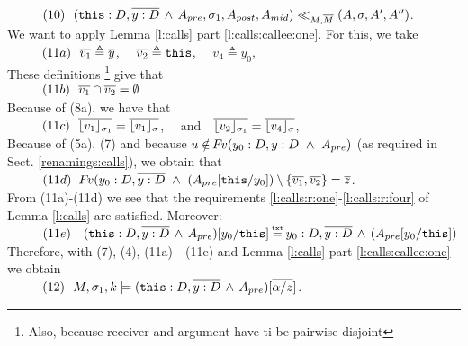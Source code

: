 \begin{description}
$\SPS (10) \ \ (\prg{this}:D,\overline{y:D}\, \wedge\, A_{pre},\sigma_1,A_{post}, A_{mid}) \ll_{M,\Mtwo} (A,\sigma,A', A'')$. 
\\
We want to apply Lemma   \ref{l:calls} part \ref{l:calls:callee:one}. For this, we take
\\
$\SPS (11a) \ \  \overline {v_1} \triangleq \overline y$, \ \ $\overline {v_2} \triangleq  \prg{this}$, \ \ $\overline {v_4} \triangleq  y_0$, 
\\
These definitions  \footnote{Also, because receiver and argument have ti be pairwise disjoint} give that 
\\
$\SPS (11b) \ \  \overline {v_1}\cap   \overline{v_2} = \emptyset $
\\
Because of (8a), we have that \\
$\SPS (11c) \ \ \overline {\interpret {\sigma_1} {v_1} } = \overline {\interpret {\sigma} {v_1} }$, \ \ and\ \  $\overline {\interpret {\sigma_1}  {v_2} } = \overline {\interpret {\sigma} {v_4} }$,\\
Because of (5a), (7)  and because $u\notin \fv(y_0:D ,\overline {y:D}\ \wedge \  A_{pre})$ (as required in Sect. \ref{renamings:calls}), we obtain that \\
$\SPS (11d) \ \ \fv(y_0:D ,\overline {y:D}\ \wedge \  (A_{pre}[\prg{this}/y_0]) \setminus \{ \overline {v_1}, \overline {v_2} \} =  \overline z$.    
\\
From   (11a)-(11d) we see that the requirements  \ref{l:calls:r:one}-\ref{l:calls:r:four} of Lemma \ref{l:calls}  are satisfied.  Moreover: \\
$\SPS (11e) \ \ \ (\prg{this}:D,\overline{y:D}\, \wedge\, A_{pre})[y_0/\prg{this}] \txteq  y_0:D,\overline{y:D}\, \wedge\, (A_{pre}[y_0/\prg{this}] )$\\
 Therefore, with (7), (4), (11a) - (11e) and    Lemma   \ref{l:calls} part \ref{l:calls:callee:one} we obtain\\
$\SPS (12) \ \  \satDAssertFrom M  {\sigma_1} {k}   {(\prg{this}:D,\overline{y:D}\, \wedge\, A_{pre})[\overline{\alpha/z}]}$.


\end{description}
